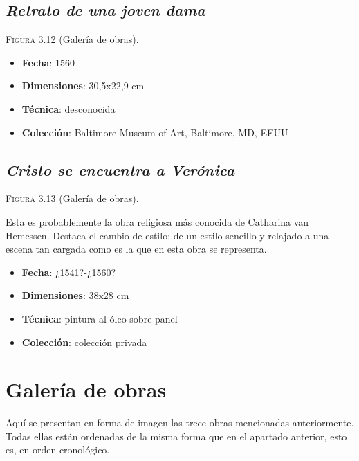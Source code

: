 \documentclass[12pt]{book}
\begin{document}
\section{\textit{Retrato de una joven dama}}

\textsc{Figura 3.12} (Galería de obras).\bigskip

\begin{itemize}
	\item \textbf{Fecha}: 1560
	\item \textbf{Dimensiones}: 30,5x22,9 cm
	\item \textbf{Técnica}: desconocida
	\item \textbf{Colección}: Baltimore Museum of Art, Baltimore, MD, EEUU
\end{itemize}

\section{\textit{Cristo se encuentra a Verónica}}

\textsc{Figura 3.13} (Galería de obras).\bigskip

Esta es probablemente la obra religiosa más conocida de Catharina van Hemessen. Destaca el cambio de estilo: de un estilo sencillo y relajado a una escena tan cargada como es la que en esta obra se representa.
\begin{itemize}
	\item \textbf{Fecha}: ¿1541?-¿1560?
	\item \textbf{Dimensiones}: 38x28 cm
	\item \textbf{Técnica}: pintura al óleo sobre panel
	\item \textbf{Colección}: colección privada
\end{itemize}

\chapter{Galería de obras}

Aquí se presentan en forma de imagen las trece obras mencionadas anteriormente. Todas ellas están ordenadas de la misma forma que en el apartado anterior, esto es, en orden cronológico.\bigskip
\end{document}
